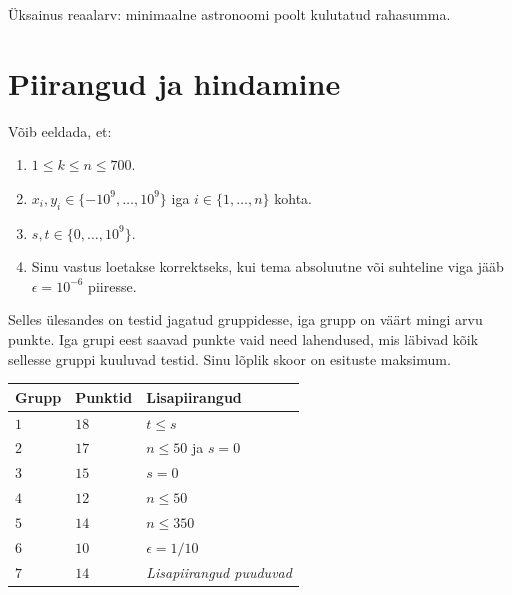 Üksainus reaalarv: minimaalne astronoomi poolt kulutatud rahasumma.

\section*{Piirangud ja hindamine}

Võib eeldada, et:
\begin{enumerate}
\item $1\leq k\leq n\leq 700$. %
\item $x_i, y_i\in \{-10^9,\ldots, 10^9\}$ iga $i\in\{1,\ldots,n\}$ kohta. %
\item $s,t\in \{0,\ldots, 10^9\}$. %
\item Sinu vastus loetakse korrektseks, kui tema absoluutne või suhteline viga jääb
$\epsilon = 10^{-6}$ piiresse.
\end{enumerate}


Selles ülesandes on testid jagatud gruppidesse, iga grupp on väärt mingi arvu punkte.
Iga grupi eest saavad punkte vaid need lahendused, mis läbivad kõik sellesse gruppi kuuluvad testid.
Sinu lõplik skoor on esituste maksimum.

\medskip
\noindent
\begin{tabular}{lll}
  Grupp & Punktid & Lisapiirangud\\\hline
  $1$ & $18$ &  $t\leq s$\\
  $2$ & $17$ & $n\le 50$ ja $s=0$\\
  $3$ & $15$ & $s=0$\\
  $4$ & $12$ & $n\leq 50$\\
  $5$ & $14$ & $n\leq 350$\\
  $6$ & $10$ & $\epsilon = 1/10$\\
  $7$ & $14$ & \emph{Lisapiirangud puuduvad}\\
\end{tabular}
